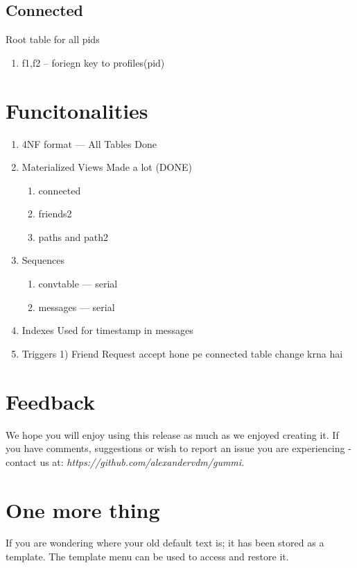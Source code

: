 \documentclass[11pt]{article}
\begin{document}
\subsection {Connected}
Root table for all pids
\begin{enumerate}
\item f1,f2 -- foriegn key to profiles(pid)
\end{enumerate}



\section{Funcitonalities}
\begin{enumerate}

	\item 4NF format --- All Tables Done

	\item Materialized Views Made a lot (DONE)
	\begin{enumerate}
	\item connected
	\item friends2
	\item paths and path2
	\end{enumerate}
	\item Sequences
	\begin{enumerate}
	\item convtable --- serial
	\item messages --- serial
	\end{enumerate}
	\item Indexes
	Used for timestamp in messages
	
	\item Triggers 1) Friend Request accept hone pe connected table change krna hai
	

\end{enumerate}

\section{Feedback}
We hope you will enjoy using this release as much as we enjoyed creating it. If you have comments, suggestions or wish to report an issue you are experiencing - contact us at: \emph{https://github.com/alexandervdm/gummi}.

\section{One more thing}
If you are wondering where your old default text is; it has been stored as a template. The template menu can be used to access and restore it. 
\end{document}

